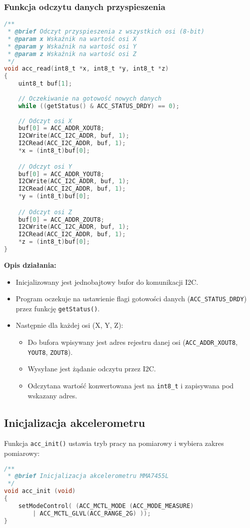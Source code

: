 \documentclass[letterpaper,11pt]{report}
\begin{document}
\subsubsection{Funkcja odczytu danych przyspieszenia}

\begin{lstlisting}[language=C]
/**
 * @brief Odczyt przyspieszenia z wszystkich osi (8-bit)
 * @param x Wskaźnik na wartość osi X
 * @param y Wskaźnik na wartość osi Y  
 * @param z Wskaźnik na wartość osi Z
 */
void acc_read(int8_t *x, int8_t *y, int8_t *z)
{
    uint8_t buf[1];
    
    // Oczekiwanie na gotowość nowych danych
    while ((getStatus() & ACC_STATUS_DRDY) == 0);
    
    // Odczyt osi X
    buf[0] = ACC_ADDR_XOUT8;
    I2CWrite(ACC_I2C_ADDR, buf, 1);
    I2CRead(ACC_I2C_ADDR, buf, 1);
    *x = (int8_t)buf[0];

    // Odczyt osi Y
    buf[0] = ACC_ADDR_YOUT8;
    I2CWrite(ACC_I2C_ADDR, buf, 1);
    I2CRead(ACC_I2C_ADDR, buf, 1);
    *y = (int8_t)buf[0];

    // Odczyt osi Z
    buf[0] = ACC_ADDR_ZOUT8;
    I2CWrite(ACC_I2C_ADDR, buf, 1);
    I2CRead(ACC_I2C_ADDR, buf, 1);
    *z = (int8_t)buf[0];
}
\end{lstlisting}


\textbf{Opis działania:}
\begin{itemize}
    \item Inicjalizowany jest jednobajtowy bufor do komunikacji I2C.
    \item Program oczekuje na ustawienie flagi gotowości danych (\texttt{ACC\_STATUS\_DRDY}) przez funkcję \texttt{getStatus()}.
    \item Następnie dla każdej osi (X, Y, Z):
    \begin{itemize}
        \item Do bufora wpisywany jest adres rejestru danej osi (\texttt{ACC\_ADDR\_XOUT8}, \texttt{YOUT8}, \texttt{ZOUT8}).
        \item Wysyłane jest żądanie odczytu przez I2C.
        \item Odczytana wartość konwertowana jest na \texttt{int8\_t} i zapisywana pod wskazany adres.
    \end{itemize}
\end{itemize}

\noindent\begin{minipage}{\linewidth}
\subsection*{Inicjalizacja akcelerometru}

Funkcja \texttt{acc\_init()} ustawia tryb pracy na pomiarowy i wybiera zakres pomiarowy:
\begin{lstlisting}[language=C]
/**
 * @brief Inicjalizacja akcelerometru MMA7455L
 */
void acc_init (void)
{
    setModeControl( (ACC_MCTL_MODE (ACC_MODE_MEASURE)
        | ACC_MCTL_GLVL(ACC_RANGE_2G) ));
}
\end{lstlisting}
\end{minipage}
\end{document}
